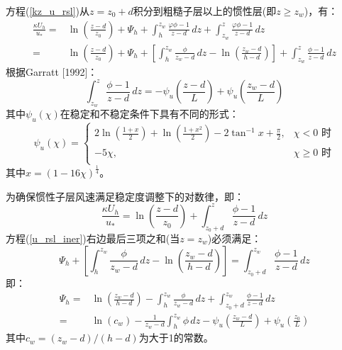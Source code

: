 方程(\ref{kz_u_rsl})从$z=z_0+d$积分到粗糙子层以上的惯性层(即$z\geqslant z_{w}$)，有：
\begin{align}\label{u_rsl_iner}
\frac{\kappa U_{h}}{u_{*}} =& \ln \left(\frac{z-d}{z_{0}}\right) + \Psi_{h} + \int_{h}^{z_{w}} \frac{\varphi \phi - 1}{z-d} \,dz
+ \int_{z_{w}}^{z} \frac{\varphi \phi - 1}{z-d} \,dz \nonumber \\[1ex]
=& \ln \left(\frac{z-d}{z_{0}}\right) + \Psi_{h} + \left[\int_{h}^{z_{w}} \frac{\phi}{z_{w}-d} \,dz - \ln \left(\frac{z_{w}-d}{h-d}\right) \right]
+ \int_{z_{w}}^{z} \frac{\phi - 1}{z-d} \,dz
\end{align}
根据Garratt [1992]：
\begin{equation}
\int_{z_{w}}^{z} \frac{\phi - 1}{z-d} \,dz = -\psi_u \left(\frac{z-d}{L} \right) + \psi_u \left(\frac{z_{w}-d}{L} \right)
\end{equation}
其中$\psi_u(\chi )$在稳定和不稳定条件下具有不同的形式：
\begin{equation}
   \psi_u(\chi ) = \begin{cases}
      2\ln \left(\frac{1+x}{2} \right) + \ln \left(\frac{1+x^2}{2} \right) - 2\tan^{-1}x + \frac {\pi}{2}, & \chi<0 \text { 时} \\[1ex]
      -5\chi, & \chi \geqslant 0 \text { 时} \\
\end{cases}
\end{equation}
其中$x=(1-16\chi)^{\frac{1}{4}}$。

为确保惯性子层风速满足稳定度调整下的对数律，即：
\begin{equation}\label{u_iner}
\frac{\kappa U_{h}}{u_{*}} = \ln \left(\frac{z-d}{z_{0}}\right) + \int_{z_{0}+d}^{z} \frac{\phi - 1}{z-d} \,dz
\end{equation}
方程(\ref{u_rsl_iner})右边最后三项之和(当$z=z_{w}$)必须满足：
\begin{equation}
\Psi_{h} + \left[\int_{h}^{z_{w}} \frac{\phi}{z_{w}-d} \,dz - \ln \left(\frac{z_{w}-d}{h-d}\right) \right] = \int_{z_{0}+d}^{z_{w}} \frac{\phi - 1}{z-d} \,dz
\end{equation}
即：
\begin{align}\label{Psih_general}
\Psi_{h} =& \ln \left(\frac{z_{w}-d}{h-d}\right) - \int_{h}^{z_{w}} \frac{\phi}{z_{w}-d} \,dz
+ \int_{z_{0}+d}^{z_{w}} \frac{\phi - 1}{z-d} \,dz \nonumber \\[1.5ex]
=& \ln \left(c_{w}\right) -\frac{1}{z_{w}-d} \int_{h}^{z_{w}} \phi \,dz - \psi_u \left(\frac{z_{w}-d}{L} \right)
+ \psi_u \left(\frac{z_{0}}{L} \right)
\end{align}
其中$c_{w}=(z_{w}-d)/(h-d)$为大于1的常数。

